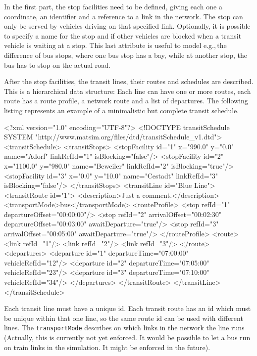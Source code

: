 In the first part, the stop facilities need to be defined, giving each one a coordinate, an identifier and a reference to a link in the network. The stop can only be served by vehicles driving on that specified link. Optionally, it is possible to specify a name for the stop and if other vehicles are blocked when a transit vehicle is waiting at a stop. This last attribute is useful to model e.g.,\,the difference of bus stops, where one bus stop has a bay, while at another stop, the bus has to stop on the actual road.

After the stop facilities, the transit lines, their routes and schedules are described. This is a hierarchical data structure: Each line can have one or more routes, each route has a route profile, a network route and a list of departures. The following listing represents an example of a minimalistic but complete transit schedule.
%
\begin{xml}
<?xml version="1.0" encoding="UTF-8"?> 
<!DOCTYPE transitSchedule SYSTEM "http://www.matsim.org/files/dtd/transitSchedule_v1.dtd"> 
<transitSchedule> 
   <transitStops> 
      <stopFacility id="1" x="990.0"  y="0.0"   name="Adorf" 
           linkRefId="1" isBlocking="false"/> 
      <stopFacility id="2" x="1100.0" y="980.0" name="Beweiler" 
           linkRefId="2" isBlocking="true"/> 
      <stopFacility id="3" x="0.0"    y="10.0"  name="Cestadt" 
           linkRefId="3" isBlocking="false"/> 
   </transitStops> 
   <transitLine id="Blue Line"> 
      <transitRoute id="1"> 
         <description>Just a comment.</description> 
         <transportMode>bus</transportMode> 
         <routeProfile> 
            <stop refId="1" departureOffset="00:00:00"/> 
            <stop refId="2" arrivalOffset="00:02:30" departureOffset="00:03:00" 
                                                     awaitDeparture="true"/> 
            <stop refId="3" arrivalOffset="00:05:00" awaitDeparture="true"/> 
         </routeProfile> 
         <route> 
            <link refId="1"/> 
            <link refId="2"/> 
            <link refId="3"/> 
         </route> 
         <departures> 
            <departure id="1" departureTime="07:00:00" vehicleRefId="12"/> 
            <departure id="2" departureTime="07:05:00" vehicleRefId="23"/> 
            <departure id="3" departureTime="07:10:00" vehicleRefId="34"/> 
         </departures> 
      </transitRoute> 
   </transitLine> 
</transitSchedule>
\end{xml}

Each transit line must have a unique id. Each transit route has an id which must be unique within that one line, so the same route id can be used with different lines. The \lstinline|transportMode| describes on which links in the network the line runs (Actually, this is currently not yet enforced. It would be possible to let a bus run on train links in the simulation. It might be enforced in the future).

